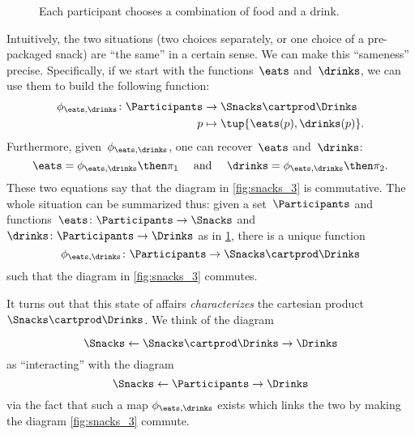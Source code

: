 \begin{figure}[h!]
    \centering
    \caption{Each participant chooses a combination of food and a drink. \label{fig:snacks_2}}
\end{figure}

Intuitively, the two situations (two choices separately, or one choice of a pre-packaged snack) are ``the same'' in a certain sense.
We can make this ``sameness'' precise.
Specifically, if we start with the functions~$\eats$ and~$\drinks$, we can use them to build the following function:
\begin{equation}
    \label{eq:snacks-building-univ-map}
    \begin{aligned}
        \phi_{\eats,\drinks}\colon \Participants & \to \Snacks\cartprod \Drinks       \\
        p                                        & \mapsto \tup{\eats(p),\drinks(p)}.
    \end{aligned}
\end{equation}
Furthermore, given~$\phi_{\eats,\drinks}$, one can recover~$\eats$ and~$\drinks$:
\begin{equation}
    \label{eq:snacks-proj-univ-map}
    \eats =\phi_{\eats,\drinks}\then \pi_1 \quad  \text{ and } \quad \drinks=\phi_{\eats,\drinks}\then \pi_2.
\end{equation}
These two equations say that the diagram in \cref{fig:snacks_3} is commutative.
The whole situation can be summarized thus: given a set~$\Participants$ and functions~$\eats\colon \Participants \to \Snacks$ and~$\drinks\colon \Participants \to \Drinks$ as in \cref{fig:snacks_2}, there is a unique function~
\begin{equation}
    \label{eq:snacks-unique-univ-map}
    \phi_{\eats,\drinks} \colon \Participants \to \Snacks \cartprod \Drinks
\end{equation}
such that the diagram in \cref{fig:snacks_3} commutes.

\begin{figure*}[h!]
    \centering
    \caption{Choosing food and drink separately is essentially the same as choosing a combination of the two. }
    \label{fig:snacks_3}
\end{figure*}

It turns out that this state of affairs \emph{characterizes} the cartesian product $\Snacks\cartprod \Drinks$.
We think of the diagram

\begin{equation}
    \label{eq:snacks-prod-diagram}
    \Snacks \leftarrow \Snacks \cartprod \Drinks \rightarrow \Drinks
\end{equation}
as ``interacting'' with the diagram
\begin{equation}
    \label{eq:snacks-prod-test-diagram}
    \Snacks \leftarrow \Participants \rightarrow \Drinks
\end{equation}
via the fact that such a map $\phi_{\eats,\drinks}$ exists which links the two by making the diagram \cref{fig:snacks_3} commute.

